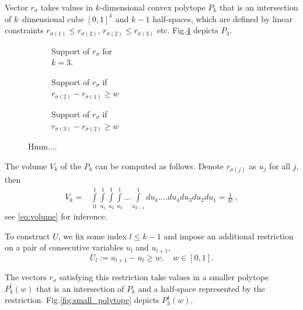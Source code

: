 \documentclass{llncs}
\begin{document}
Vector $r_{\sigma}$ takes values in $k$-dimensional convex polytope $P_k$ that is 
an intersection of $k$--dimensional cube $[0, 1]^{k}$ and 
$k-1$ half-spaces, which are defined by linear constraints $r_{\sigma(1)} \le r_{\sigma(2)}$, $r_{\sigma(2)} \le r_{\sigma(3)}$ etc.
Fig.\ref{fig:polytop} depicts $P_3$. 
\begin{figure}
     \centering
     \begin{subfigure}[b]{0.3\textwidth}
         \centering 
         \caption{Support of $r_{\sigma}$ for \\\hspace{\textwidth}$k=3$.}
         \label{fig:polytop}
     \end{subfigure}
     \begin{subfigure}[b]{0.3\textwidth}
         \centering 
         \caption{Support of $r_{\sigma}$ if\\\hspace{\textwidth}$r_{\sigma(2)} - r_{\sigma(1)} \ge w$}
         \label{fig:polytop}
     \end{subfigure}
     \begin{subfigure}[b]{0.3\textwidth}
         \centering 
         \caption{Support of $r_{\sigma}$ if\\\hspace{\textwidth}$r_{\sigma(3)} - r_{\sigma(2)} \ge w$}
         \label{fig:polytop}
     \end{subfigure}
    \caption{Hmm....}
\end{figure}


The volume $V_k$ of the $P_k$ can be computed as follows. Denote $r_{\sigma(j)}$ as $u_j$ for all $j$, then
\begin{eqnarray*}
V_k = &\displaystyle \int\limits_0^1\int\limits_{u_1}^1\int\limits_{u_2}^1\int\limits_{u_3}^1...\int\limits_{u_{k-1}}^1 du_k....du_4 du_3 du_2 du_1 =  \frac{1}{k!}~,
\end{eqnarray*}
see \eqref{eq:volume} for inference.

To construct $U$, we fix some index $l\leq k-1$ and impose an additional restriction on a pair of consecutive variables $u_{l}$ and $u_{l+1}$,
\[
U_{l} := u_{l+1} - u_{l} \ge w, \quad w \in [0, 1]. 
\]

The vectors $r_{\sigma}$ satisfying this restriction take values in a smaller polytope $P^{l}_{k}(w)$ that is an intersection of $P_{k}$ and a half-space represented by the restriction.
Fig.\ref{fig:small_polytope} depicts $P^{1}_{3}(w)$. 
\end{document}
